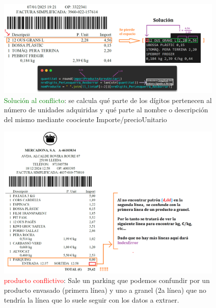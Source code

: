 \documentclass{beamer}
\begin{document}
		
		\begin{frame}	
			\begin{figure}
				\centering
				\includegraphics[width=1\linewidth]{imgEspecifiques/ticketExtraccioO}
				\caption{\textcolor{green}{Solución al conflicto}: se calcula qué parte de los dígitos pertenecen al número de unidades adquiridas y qué parte al nombre o descripción del mismo mediante coociente Importe/precioUnitario}
				\label{fig:ticketextraccionO}
			\end{figure}
		\end{frame}
			
			
	
	\begin{frame}	
		\begin{figure}
			\centering
			\includegraphics[width=.75\linewidth]{imgEspecifiques/ticketExtraccioP}
			\caption{\textcolor{red}{producto conflictivo}: Sale un parking que podemos confundir por un producto envasado (primera línea) y uno a granel (2a línea) que no tendría la línea que lo suele seguir con los datos a extraer.}
			\label{fig:ticketextraccionP}
		\end{figure}
	\end{frame}
	
\end{document}

